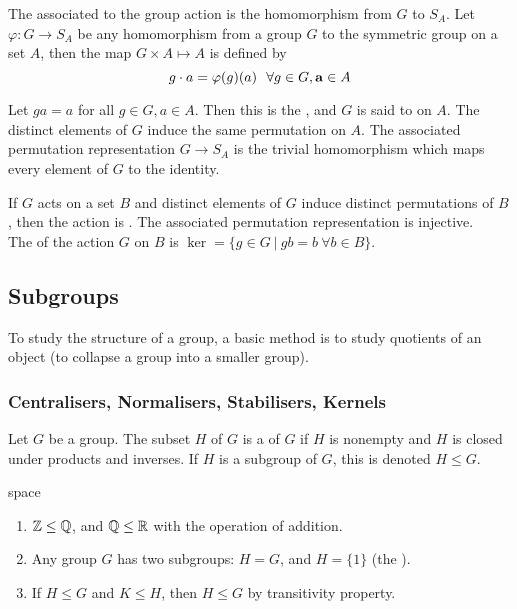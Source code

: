 \begin{definition}
The  associated to the group action is the homomorphism from $G$ to $S_A$. Let $\varphi: G \rightarrow S_A$ be any homomorphism from a group $G$ to the symmetric group on a set $A$, then the map $G \times A \mapsto A$ is defined by
\begin{equation}
g \cdot a = \varphi(g)(a) \ \ \forall g\in G, \a \in A \nonumber
\end{equation}
\end{definition}

\begin{definition}
Let $ga=a$ for all $g\in G, a\in A$. Then this is the , and $G$ is said to  on $A$. The distinct elements of $G$ induce the same permutation on $A$. The associated permutation representation $G\rightarrow S_A$ is the trivial homomorphism which maps every element of $G$ to the identity.
\end{definition}

\begin{definition}
If $G$ acts on a set $B$ and distinct elements of $G$ induce distinct permutations of $B$, then the action is . The associated permutation representation is injective.\\
The  of the action $G$ on $B$ is $\ker = \{g \in G \ \vert \ gb = b \ \forall b \in B \}$.
\end{definition}

\subsection{Subgroups}

To study the structure of a group, a basic method is to study quotients of an object (to collapse a group into a smaller group).

\subsubsection{Centralisers, Normalisers, Stabilisers, Kernels}

\begin{definition}
Let $G$ be a group. The subset $H$ of $G$ is a  of $G$ if $H$ is nonempty and $H$ is closed under products and inverses. If $H$ is a subgroup of $G$, this is denoted $H \leq G$.
\end{definition}

\begin{example}{\color{white}space}
\begin{enumerate}[label=(\roman*)]
\setlength{\itemsep}{0pt}
\item $\mathbb{Z} \leq \mathbb{Q}$, and $\mathbb{Q} \leq \mathbb{R}$ with the operation of addition.
\item Any group $G$ has two subgroups: $H = G$, and $H = \{1\}$ (the ).
\item If $H \leq G$ and $K \leq H$, then $H \leq G$ by transitivity property.
\end{enumerate}
\end{example}


